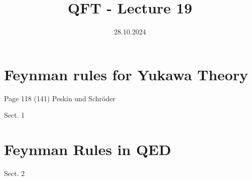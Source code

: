 \documentclass[]{scrartcl}
\title{QFT - Lecture 19}
\author{}
\date{28.10.2024}
\begin{document}
\maketitle
\newpage
\tableofcontents
\newpage

\section{Feynman rules for Yukawa Theory} 

Page 118 (141) Peskin und Schröder

Sect. 1

\section{Feynman Rules in QED}

Sect. 2
\end{document}
